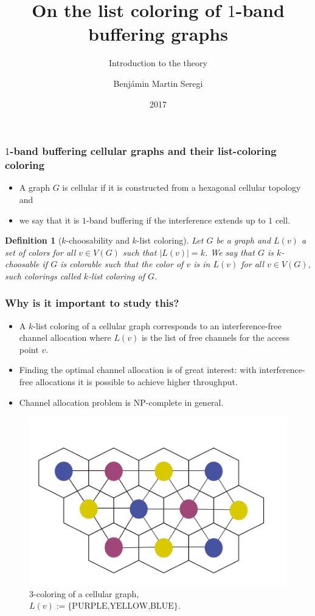\documentclass{beamer} %
\title{On the list coloring of $1$-band buffering graphs}
\subtitle{Introduction to the theory}
\author{Benjámin Martin Seregi}
\institute{
      \\[\medskipamount]
      KTH Royal Institute of Technology \\ II2202, Fall 2017, Period 1-2
}
\date{2017}
\newtheorem{defi}[lem]{Definition}
\begin{document}
\frame{\titlepage}

\begin{frame}
\frametitle{$1$-band buffering cellular graphs and their list-coloring coloring}
\justifying
\begin{itemize}
\item A graph $G$ is cellular if it is constructed from a hexagonal cellular topology and
\pause \item we say that it is $1$-band buffering if the interference extends up to $1$ cell.
\end{itemize}
\pause \begin{defi}[$k$-choosability and $k$-list coloring]
Let $G$ be a graph and $L(v)$ a set of colors for all $v \in V(G)$ such that $|L(v)|=k$. We say that $G$ is $k$\textit{-choosable} if $G$ is colorable such that the color of $v$ is in $L(v)$ for all $v \in V(G)$, such colorings called $k$\textit{-list coloring} of $G$.
\end{defi}
\end{frame}

\begin{frame}
\frametitle{Why is it important to study this?}
\justifying
\begin{itemize}
\item A $k$-list coloring of a cellular graph corresponds to an interference-free channel allocation where $L(v)$ is the list of free channels for the access point $v$.
\pause \item Finding the optimal channel allocation is of great interest: with interference-free allocations it is possible to achieve higher throughput.
\pause \item Channel allocation problem is $\mathrm{NP}$-complete in general.
\end{itemize}
\begin{figure}
\caption{3-coloring of a cellular graph, $L(v):=\lbrace \text{PURPLE,YELLOW,BLUE} \rbrace.$}
\includegraphics[scale=0.15]{3_coloring_cellular.png}
\end{figure}
\end{frame}
\end{document}
